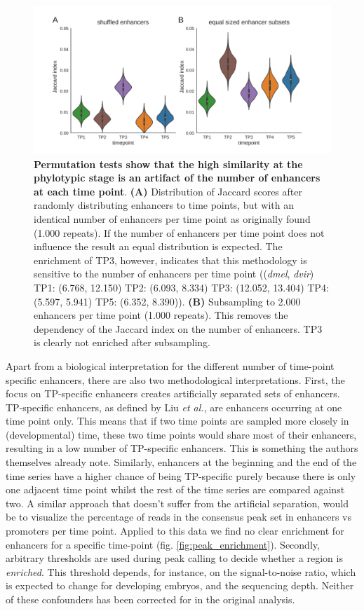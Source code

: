 \begin{figure}[H]
    \includegraphics[width=\linewidth]{ch.hourglass/images/fly_shuffle.png}
    \caption{\textbf{Permutation tests show that the high similarity at the phylotypic stage is an artifact of the number of enhancers at each time point}. \textbf{(A)} Distribution of Jaccard scores after randomly distributing enhancers to time points, but with an identical number of enhancers per time point as originally found (1.000 repeats). If the number of enhancers per time point does not influence the result an equal distribution is expected. The enrichment of TP3, however, indicates that this methodology is sensitive to the number of enhancers per time point ((\textit{dmel}, \textit{dvir}) TP1: (6.768, 12.150) TP2: (6.093, 8.334) TP3: (12.052, 13.404) TP4: (5.597, 5.941) TP5: (6.352, 8.390)). \textbf{(B)} Subsampling to 2.000 enhancers per time point (1.000 repeats). This removes the dependency of the Jaccard index on the number of enhancers. TP3 is clearly not enriched after subsampling.}
    \label{fig:shuffle}
\end{figure}

Apart from a biological interpretation for the different number of time-point specific enhancers, there are also two methodological interpretations. First, the focus on TP-specific enhancers creates artificially separated sets of enhancers. TP-specific enhancers, as defined by Liu \textit{et al.}, are enhancers occurring at one time point only. This means that if two time points are sampled more closely in (developmental) time, these two time points would share most of their enhancers, resulting in a low number of TP-specific enhancers. This is something the authors themselves already note. Similarly, enhancers at the beginning and the end of the time series have a higher chance of being TP-specific purely because there is only one adjacent time point whilst the rest of the time series are compared against two. A similar approach that doesn't suffer from the artificial separation, would be to visualize the percentage of reads in the consensus peak set in enhancers vs promoters per time point. Applied to this data we find no clear enrichment for enhancers for a specific time-point (fig. \ref{fig:peak_enrichment}). Secondly, arbitrary thresholds are used during peak calling to decide whether a region is \textit{enriched}. This threshold depends, for instance, on the signal-to-noise ratio, which is expected to change for developing embryos, and the sequencing depth\cite{encode_guidelines2012}. Neither of these confounders has been corrected for in the original analysis.

